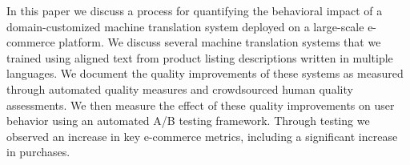 In this paper we discuss a process for quantifying the behavioral impact of a domain-customized machine translation system deployed on a large-scale e-commerce platform. We discuss several machine translation systems that we trained using aligned text from product listing descriptions written in multiple languages. We document the quality improvements of these systems as measured through automated quality measures and crowdsourced human quality assessments. We then measure the effect of these quality improvements on user behavior using an automated A/B testing framework. Through testing we observed an increase in key e-commerce metrics, including a significant increase in purchases.
